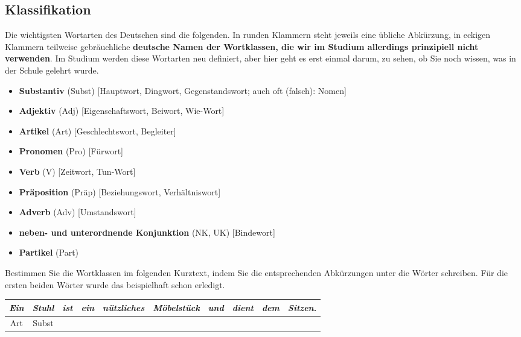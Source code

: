 \documentclass[12pt,a4paper,twoside]{article}
\newcommand{\Zeile}{\vspace{\baselineskip}}
\newcommand{\Lf}{
  \setlength{\itemsep}{1pt}
  \setlength{\parskip}{0pt}
  \setlength{\parsep}{0pt}
}
\begin{document}
\subsection{ Klassifikation}

Die wichtigsten Wortarten des Deutschen sind die folgenden.
In runden Klammern steht jeweils eine übliche Abkürzung, in eckigen Klammern teilweise gebräuchliche \textbf{deutsche Namen der Wortklassen, die wir im Studium allerdings prinzipiell nicht verwenden}.
Im Studium werden diese Wortarten neu definiert, aber hier geht es erst einmal darum, zu sehen, ob Sie noch wissen, was in der Schule gelehrt wurde.

\begin{itemize}\Lf
  \item \textbf{Substantiv} (Subst) [Hauptwort, Dingwort, Gegenstandswort; auch oft (falsch): Nomen]
  \item \textbf{Adjektiv} (Adj) [Eigenschaftswort, Beiwort, Wie-Wort]
  \item \textbf{Artikel} (Art) [Geschlechtswort, Begleiter]
  \item \textbf{Pronomen} (Pro) [Fürwort]
  \item \textbf{Verb} (V) [Zeitwort, Tun-Wort]
  \item \textbf{Präposition} (Präp) [Beziehungswort, Verhältniswort]
  \item \textbf{Adverb} (Adv) [Umstandswort]
  \item \textbf{neben- und unterordnende Konjunktion} (NK, UK) [Bindewort]
  \item \textbf{Partikel} (Part)
\end{itemize}

Bestimmen Sie die Wortklassen im folgenden Kurztext, indem Sie die entsprechenden Abkürzungen unter die Wörter schreiben.
Für die ersten beiden Wörter wurde das beispielhaft schon erledigt.

\Zeile

\begin{center}
  \large
  \begin{tabular}[h]{|c|c|c|c|c|c|c|c|c|c|}
    \hline
      \textit{Ein} & \textit{Stuhl} & \textit{ist} & \textit{ein} & \textit{nützliches} & \textit{Möbelstück} & \textit{und} & \textit{dient} & \textit{dem} & \textit{Sitzen}. \\
      \hline
      Art & Subst &&&&&&&& \\
    \hline
  \end{tabular}
\end{center}
\end{document}
